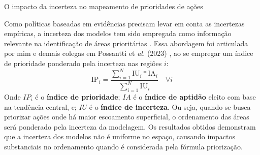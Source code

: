 \documentclass[./main.tex]{subfiles}
\begin{document}
\begin{simplebox}[
    float=ht!,
    label={destaque_mapas_incerteza},
    nameref={Mapas de incerteza}
    ]{O impacto da incerteza no mapeamento de prioridades de ações}
    \begin{minipage}[t]{\linewidth}
    
    \par Como políticas baseadas em evidências precisam levar em conta as incertezas empíricas, a incerteza dos modelos tem sido empregada como informação relevante na identificação de áreas prioritárias \cite{EVENSON2021}. Essa abordagem foi articulada por mim e demais colegas em Possantti et \textit{al.} (2023) \cite{Possantti2023a}, ao se empregar um índice de prioridade ponderado pela incerteza nas regiões $i$:
    \begin{equation}
        \label{eq:ip}
        \text{IP}_{i} = \frac{\sum_{i=1}^{N}\text{IU}_{i} * \text{IA}_{i} }{\sum_{i=1}^{N}\text{IU}_{i}} \quad \forall i
    \end{equation}
    Onde $IP_{i}$ é o \textbf{índice de prioridade}; $IA$ é o \textbf{índice de aptidão} eleito com base na tendência central, e; $IU$ é o \textbf{índice de incerteza}. Ou seja, quando se busca priorizar ações onde há maior escoamento superficial, o ordenamento das áreas será ponderado pela incerteza da modelagem. Os resultados obtidos demonstram que a incerteza dos modelos não é uniforme no espaço, causando impactos substanciais no ordenamento quando é considerada pela fórmula priorização.    
    
    \end{minipage}
\label{box:uncert}
\normalsize
\end{simplebox}
\end{document}
